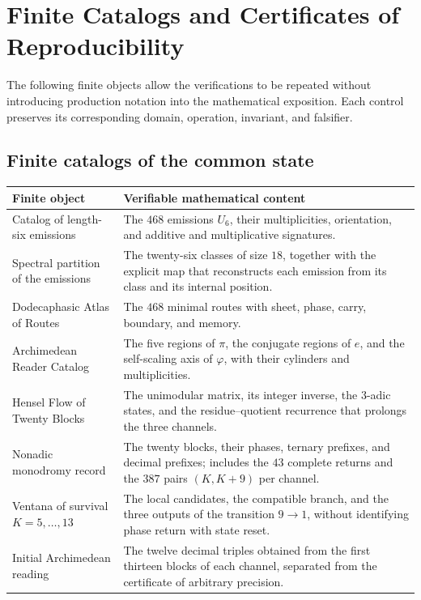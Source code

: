 \chapter{Finite Catalogs and Certificates of Reproducibility}
\label{app:datos-reproducibles}

The following finite objects allow the verifications to be repeated without
introducing production notation into the mathematical exposition. Each control
preserves its corresponding domain, operation, invariant, and
falsifier.

\section{Finite catalogs of the common state}

\begin{longtable}{@{}>{\raggedright\arraybackslash}p{}
  >{\raggedright\arraybackslash}p{}@{}}
\toprule
Finite object & Verifiable mathematical content\\
\midrule
\endhead
Catalog of length-six emissions
& The \(468\) emissions \(U_6\), their multiplicities, orientation, and additive
and multiplicative signatures.\\
Spectral partition of the emissions
& The twenty-six classes of size \(18\), together with the explicit map that
reconstructs each emission from its class and its internal position.\\
Dodecaphasic Atlas of Routes
& The \(468\) minimal routes with sheet, phase, carry, boundary, and memory.\\
Archimedean Reader Catalog
& The five regions of \(\pi\), the conjugate regions of \(e\), and the self-scaling
axis of \(\varphi\), with their cylinders and multiplicities.\\
Hensel Flow of Twenty Blocks
& The unimodular matrix, its integer inverse, the \(3\)-adic states, and the
residue--quotient recurrence that prolongs the three channels.\\
Nonadic monodromy record
& The twenty blocks, their phases, ternary prefixes, and decimal prefixes;
includes the \(43\) complete returns and the \(387\) pairs \((K,K+9)\) per
channel.\\
Ventana of survival \(K=5,\ldots,13\)
& The local candidates, the compatible branch, and the three outputs of the
transition \(9\to1\), without identifying phase return with state reset.\\
Initial Archimedean reading
& The twelve decimal triples obtained from the first thirteen blocks of each
channel, separated from the certificate of arbitrary precision.\\
\bottomrule
\end{longtable}

